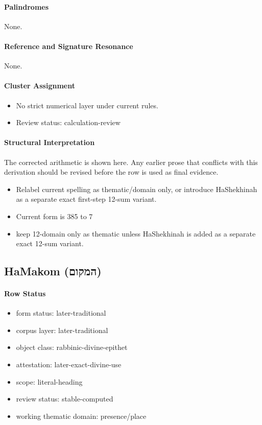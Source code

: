 \paragraph{Palindromes}
None.
\paragraph{Reference and Signature Resonance}
None.
\paragraph{Cluster Assignment}
\begin{itemize}
\item No strict numerical layer under current rules.
\item Review status: calculation-review
\end{itemize}
\paragraph{Structural Interpretation}
The corrected arithmetic is shown here. Any earlier prose that conflicts with this derivation should be revised before the row is used as final evidence.

\begin{itemize}
\item Relabel current spelling as thematic/domain only, or introduce HaShekhinah as a separate exact first-step 12-sum variant.
\item Current form is 385 to 7
\item keep 12-domain only as thematic unless HaShekhinah is added as a separate exact 12-sum variant.
\end{itemize}

\subsection{HaMakom (המקום)}
\paragraph{Row Status}
\begin{itemize}
\item form status: later-traditional
\item corpus layer: later-traditional
\item object class: rabbinic-divine-epithet
\item attestation: later-exact-divine-use
\item scope: literal-heading
\item review status: stable-computed
\item working thematic domain: presence/place
\end{itemize}
